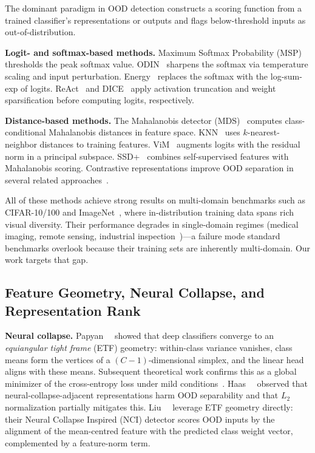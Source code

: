 \documentclass[runningheads]{llncs}
\begin{document}
The dominant paradigm in OOD detection constructs a scoring function from a trained classifier's representations or outputs and flags below-threshold inputs as out-of-distribution.

\noindent\textbf{Logit- and softmax-based methods.}
Maximum Softmax Probability (MSP)~\cite{Hendrycks2017msp} thresholds the peak softmax value.
ODIN~\cite{Liang2018odin} sharpens the softmax via temperature scaling and input perturbation.
Energy~\cite{Liu2020energy} replaces the softmax with the log-sum-exp of logits.
ReAct~\cite{Sun2021react} and DICE~\cite{Sun2022dice} apply activation truncation and weight sparsification before computing logits, respectively.

\noindent\textbf{Distance-based methods.}
The Mahalanobis detector (MDS)~\cite{Lee2018maha} computes class-conditional Mahalanobis distances in feature space.
KNN~\cite{Sun2022knn} uses $k$-nearest-neighbor distances to training features.
ViM~\cite{Wang2022vim} augments logits with the residual norm in a principal subspace.
SSD+~\cite{Sehwag2021ssd} combines self-supervised features with Mahalanobis scoring.
Contrastive representations improve OOD separation in several related approaches~\cite{Tack2020csi,Winkens2020contrastive,Khosla2020supcon}.

All of these methods achieve strong results on multi-domain benchmarks such as CIFAR-10/100 and ImageNet~\cite{Yang2022openood,Yang2024survey}, where in-distribution training data spans rich visual diversity.
Their performance degrades in single-domain regimes (medical imaging, remote sensing, industrial inspection~\cite{Cao2020medood,Berger2021medood})---a failure mode standard benchmarks overlook because their training sets are inherently multi-domain.
Our work targets that gap.

\subsection{Feature Geometry, Neural Collapse, and Representation Rank}
\label{sec:related:nc}

\noindent\textbf{Neural collapse.}
Papyan~\etal~\cite{Papyan2020nc} showed that deep classifiers converge to an \emph{equiangular tight frame} (ETF) geometry: within-class variance vanishes, class means form the vertices of a $(C{-}1)$-dimensional simplex, and the linear head aligns with these means.
Subsequent theoretical work confirms this as a global minimizer of the cross-entropy loss under mild conditions~\cite{Zhu2021nc}.
Haas~\etal~\cite{Haas2022ncood} observed that neural-collapse-adjacent representations harm OOD separability and that $L_2$ normalization partially mitigates this.
Liu~\etal~\cite{Liu2023nci} leverage ETF geometry directly: their Neural Collapse Inspired (NCI) detector scores OOD inputs by the alignment of the mean-centred feature with the predicted class weight vector, complemented by a feature-norm term.
\end{document}
